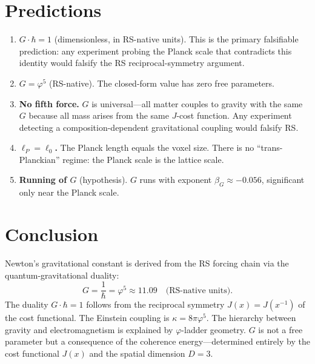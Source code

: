\documentclass[12pt,a4paper]{article}
\theoremstyle{definition}
\theoremstyle{remark}
\begin{document}
\section{Predictions}
\label{sec:predictions}

\begin{enumerate}
  \item \textbf{$G \cdot \hbar = 1$} (dimensionless, in RS-native
  units).  This is the primary falsifiable prediction: any
  experiment probing the Planck scale that contradicts this
  identity would falsify the RS reciprocal-symmetry argument.

  \item \textbf{$G = \varphi^5$} (RS-native).  The closed-form
  value has zero free parameters.

  \item \textbf{No fifth force.}  $G$ is universal---all matter
  couples to gravity with the same $G$ because all mass arises
  from the same $J$-cost function.  Any experiment detecting a
  composition-dependent gravitational coupling would falsify RS.

  \item \textbf{$\ell_P = \ell_0$.}  The Planck length equals the
  voxel size.  There is no ``trans-Planckian'' regime: the Planck
  scale is the lattice scale.

  \item \textbf{Running of $G$} (hypothesis).  $G$ runs with
  exponent $\beta_G \approx -0.056$, significant only near the
  Planck scale.
\end{enumerate}

\section{Conclusion}
\label{sec:conclusion}

Newton's gravitational constant is derived from the RS forcing
chain via the quantum-gravitational duality:
\begin{equation}
  G = \frac{1}{\hbar} = \varphi^5 \approx 11.09
  \quad\text{(RS-native units)}.
\end{equation}
The duality $G \cdot \hbar = 1$ follows from the reciprocal
symmetry $J(x) = J(x^{-1})$ of the cost functional.  The
Einstein coupling is $\kappa = 8\pi\varphi^5$.  The hierarchy
between gravity and electromagnetism is explained by
$\varphi$-ladder geometry.  $G$ is not a free parameter but a
consequence of the coherence energy---determined entirely by the
cost functional $J(x)$ and the spatial dimension $D = 3$.
\end{document}
